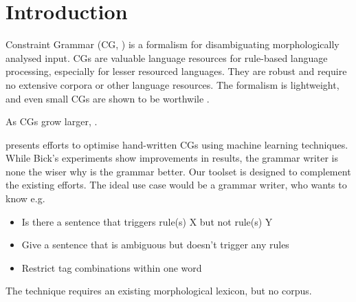 \section{Introduction}

Constraint Grammar (CG, \cite{karlsson1995constraint})
is a formalism for disambiguating morphologically analysed input.
CGs are valuable language resources for rule-based language processing, especially for lesser resourced languages. They are robust and require no extensive corpora or other language resources. The formalism is lightweight, and even small CGs are shown to be worthwile \cite{lene_trond2011}.

As CGs grow larger, .

\cite{bick2013tuning} presents efforts to optimise hand-written CGs using machine learning techniques.
While Bick's experiments show improvements in results, the grammar writer is none the wiser why is the grammar better.
Our toolset is designed to complement the existing efforts.
The ideal use case would be a grammar writer, who wants to know e.g.

\begin{itemize}
\item Is there a sentence that triggers rule(s) X but not rule(s) Y
\item Give a sentence that is ambiguous but doesn't trigger any rules
\item Restrict tag combinations within one word
\end{itemize}

The technique requires an existing morphological lexicon, but no corpus.